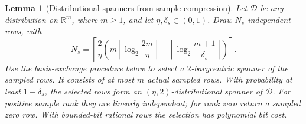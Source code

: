 \documentclass[11pt]{article}
\newtheorem{lemma}[theorem]{Lemma}
\theoremstyle{definition}
\theoremstyle{remark}
\begin{document}
\begin{lemma}[Distributional spanners from sample compression]\label{lem:compression-spanner}
Let $\mathcal D$ be any distribution on $\mathbb R^m$, where $m\ge1$, and let $\eta,\delta_s\in(0,1)$. Draw $N_s$ independent rows, with
\[
N_s=\left\lceil\frac2\eta\left(
 m\left\lceil\log_2\frac{2m}{\eta}\right\rceil+
 \left\lceil\log_2\frac{m+1}{\delta_s}\right\rceil
\right)\right\rceil.
\]
Use the basis-exchange procedure below to select a $2$-barycentric spanner of the sampled rows. It consists of at most $m$ actual sampled rows. With probability at least $1-\delta_s$, the selected rows form an $(\eta,2)$-distributional spanner of $\mathcal D$. For positive sample rank they are linearly independent; for rank zero return a sampled zero row. With bounded-bit rational rows the selection has polynomial bit cost.
\end{lemma}
\end{document}
